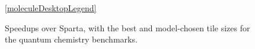 \begin{figure}[t]
    \ref{moleculeDesktopLegend}
    \centering
    
    
    \caption{Speedups over Sparta, with the best and model-chosen tile sizes for the quantum chemistry benchmarks.}
    \label{fig::molecules}
    \end{figure}
